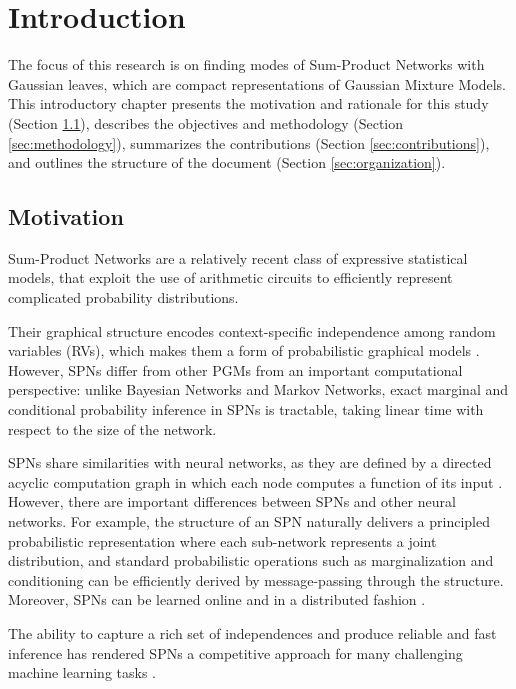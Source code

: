 \chapter{Introduction}
\label{cap:introduction}

The focus of this research is on finding modes of Sum-Product Networks with Gaussian leaves, which are compact representations of Gaussian Mixture Models. This introductory chapter presents the motivation and rationale for this study (Section \ref{sec:motivation}), describes the objectives and methodology (Section \ref{sec:methodology}), summarizes the contributions (Section \ref{sec:contributions}), and outlines the structure of the document (Section \ref{sec:organization}).

\section{Motivation}
\label{sec:motivation}

Sum-Product Networks \citep[SPNs;][]{Poon2011} are a relatively recent class of expressive statistical models, that exploit the use of arithmetic circuits \citep{Darwiche2003, Rooshenas2014} to efficiently represent complicated probability distributions.

Their graphical structure encodes context-specific independence among random variables (RVs), which makes them a form of probabilistic graphical models \citep[PGMs;][]{Koller2009}. However, SPNs differ from other PGMs from an important computational perspective: unlike Bayesian Networks and Markov Networks, exact marginal and conditional probability inference in SPNs is tractable, taking linear time with respect to the size of the network.

SPNs share similarities with neural networks, as they are defined by a directed acyclic computation graph in which each node computes a function of its input \citep{Hsu2017}. However, there are important differences between SPNs and other neural networks. For example, the structure of an SPN naturally delivers a principled probabilistic representation where each sub-network represents a joint distribution, and standard probabilistic operations such as marginalization and conditioning can be efficiently derived by message-passing through the structure. Moreover, SPNs can be learned online \citep{Lee2013, Jaini2016} and in a distributed fashion \citep{Rashwan2016}.

The ability to capture a rich set of independences and produce reliable and fast inference has rendered SPNs a competitive approach for many challenging machine learning tasks \citep{Poon2011, Llerena2017, Peharz2014, Cheng2014, Amer2016}.

